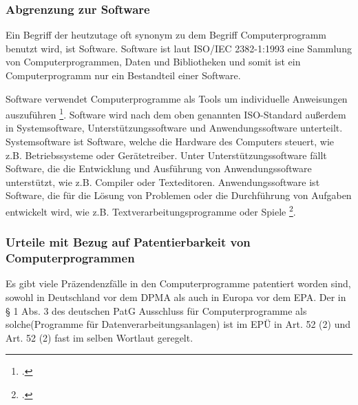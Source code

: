 \subsubsection{Abgrenzung zur Software}
Ein Begriff der heutzutage oft synonym zu dem Begriff Computerprogramm benutzt wird,
ist Software. Software ist 
laut ISO/IEC 2382-1:1993 eine Sammlung von Computerprogrammen, 
Daten und Bibliotheken und 
somit ist ein Computerprogramm nur ein Bestandteil einer Software.

Software verwendet Computerprogramme 
als Tools um individuelle Anweisungen auszuführen 
\footcite{ComputerProgrammeUnverzichtbareComputerprogramme}.
Software wird nach dem oben genannten ISO-Standard außerdem in 
Systemsoftware, Unterstützungssoftware und Anwendungssoftware unterteilt.
Systemsoftware ist Software, welche die Hardware des Computers steuert, 
wie z.B. Betriebssysteme oder Gerätetreiber. Unter Unterstützungssoftware 
fällt Software, die die Entwicklung und Ausführung von Anwendungssoftware
unterstützt, wie z.B. Compiler oder Texteditoren. Anwendungssoftware ist
Software, die für die Lösung von Problemen oder die Durchführung von Aufgaben
entwickelt wird, wie z.B. Textverarbeitungsprogramme oder Spiele
\footcite{instituteofelectricalandelectronicsengineersinc.ISO47652010}.
\\

\subsubsection{Urteile mit Bezug auf Patentierbarkeit von Computerprogrammen}
Es gibt viele Präzendenzfälle in den Computerprogramme patentiert worden sind, 
sowohl in Deutschland vor dem DPMA als auch in Europa vor dem EPA.
Der in § 1 Abs. 3 des deutschen PatG Ausschluss für Computerprogramme als 
solche(Programme für Datenverarbeitungsanlagen) ist im EPÜ in Art. 52 (2) 
und Art. 52 (2) fast im selben Wortlaut geregelt.

